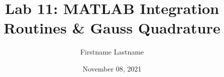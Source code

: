 \newcommand{\course}{MATH 3341}
\title{Lab 11: MATLAB Integration Routines \& Gauss Quadrature}
\author{Firstname Lastname}
\date{November 08, 2021}
